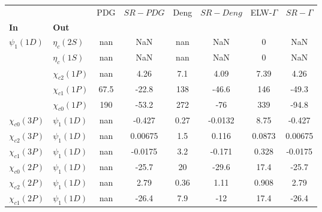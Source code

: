 \begin{tabular}{l|l|c|c|c|c|c|c}
\toprule
                &                &  PDG & $SR-PDG$ &  Deng & $SR-Deng$ &  ELW-$\Gamma$ & $SR-\Gamma$ \\
\textbf{In} & \textbf{Out} &      &          &       &           &               &             \\
\midrule
\textbf{$\psi_{1}(1D)$} & \textbf{$\eta_{c}(2S)$} &  nan &      NaN &   nan &       NaN &             0 &         NaN \\
                & \textbf{$\eta_{c}(1S)$} &  nan &      NaN &   nan &       NaN &             0 &         NaN \\
                & \textbf{$\chi_{c2}(1P)$} &  nan &     4.26 &   7.1 &      4.09 &          7.39 &        4.26 \\
                & \textbf{$\chi_{c1}(1P)$} & 67.5 &    -22.8 &   138 &     -46.6 &           146 &       -49.3 \\
                & \textbf{$\chi_{c0}(1P)$} &  190 &    -53.2 &   272 &       -76 &           339 &       -94.8 \\
\textbf{$\chi_{c0}(3P)$} & \textbf{$\psi_{1}(1D)$} &  nan &   -0.427 &  0.27 &   -0.0132 &          8.75 &      -0.427 \\
\textbf{$\chi_{c2}(3P)$} & \textbf{$\psi_{1}(1D)$} &  nan &  0.00675 &   1.5 &     0.116 &        0.0873 &     0.00675 \\
\textbf{$\chi_{c1}(3P)$} & \textbf{$\psi_{1}(1D)$} &  nan &  -0.0175 &   3.2 &    -0.171 &         0.328 &     -0.0175 \\
\textbf{$\chi_{c0}(2P)$} & \textbf{$\psi_{1}(1D)$} &  nan &    -25.7 &    20 &     -29.6 &          17.4 &       -25.7 \\
\textbf{$\chi_{c2}(2P)$} & \textbf{$\psi_{1}(1D)$} &  nan &     2.79 &  0.36 &      1.11 &         0.908 &        2.79 \\
\textbf{$\chi_{c1}(2P)$} & \textbf{$\psi_{1}(1D)$} &  nan &    -26.4 &   7.9 &       -12 &          17.4 &       -26.4 \\
\bottomrule
\end{tabular}
